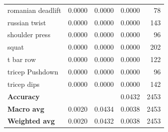 \begin{table}[!h]
\begin{tabular}{l c c c r}
romanian deadlift         & 0.0000             & 0.0000          & 0.0000            & 78               \\
russian twist             & 0.0000             & 0.0000          & 0.0000            & 143              \\
shoulder press            & 0.0000             & 0.0000          & 0.0000            & 96               \\
squat                     & 0.0000             & 0.0000          & 0.0000            & 202              \\
t bar row                 & 0.0000             & 0.0000          & 0.0000            & 122              \\
tricep Pushdown           & 0.0000             & 0.0000          & 0.0000            & 96               \\
tricep dips               & 0.0000             & 0.0000          & 0.0000            & 142              \\
\hline
\multicolumn{1}{l}{\textbf{Accuracy}}      &                   &           &          0.0432         & 2453             \\
\multicolumn{1}{l}{\textbf{Macro avg}}     & 0.0020            & 0.0434          & 0.0038            & 2453             \\
\multicolumn{1}{l}{\textbf{Weighted avg}}  & 0.0020            & 0.0432          & 0.0038            & 2453             \\
\hline
\end{tabular}
\end{table}